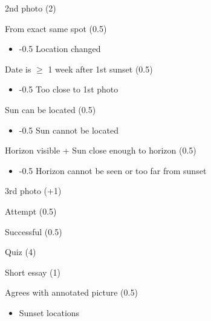 \documentclass[12pt]{article}
\begin{document}
\begin{longenum}
\begin{longenum}
\begin{longenum}
\begin{longenum}
           \item 2nd photo (2)
                \begin{longenum}
               \item From exact same spot (0.5)
                    \begin{itemize}
                    \item -0.5 Location changed
                    \end{itemize}
                \item Date is $\geq$ 1 week after 1st sunset (0.5)
                    \begin{itemize}
                    \item -0.5 Too close to 1st photo
                    \end{itemize}
                \item Sun can be located (0.5)
                    \begin{itemize}
                    \item -0.5 Sun cannot be located
                    \end{itemize}
                \item Horizon visible + Sun close enough to horizon (0.5)
                    \begin{itemize}
                    \item -0.5 Horizon cannot be seen or too far from sunset
                    \end{itemize}
                \end{longenum}
            \item 3rd photo (+1)
                \begin{longenum}
                \item Attempt (0.5)
                \item Successful (0.5)
                \end{longenum}
            \end{longenum}
        \end{longenum}
        \item Quiz (4)
            \begin{longenum}
            \item Short essay (1)
                \begin{longenum}
                \item Agrees with annotated picture (0.5)
                    \begin{itemize}
                    \item Sunset locations

\end{itemize}
\end{longenum}
\end{longenum}
\end{longenum}
\end{longenum}
\end{document}
